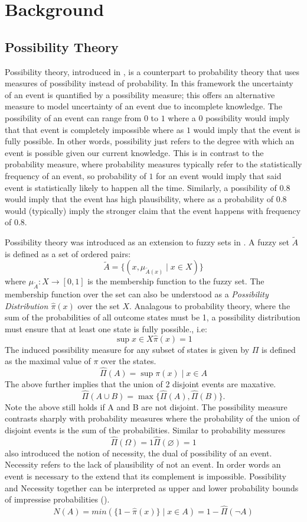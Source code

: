 \documentclass[14pt,a4paper]{report}
\begin{document}
\chapter{Background}
\section{Possibility Theory}
Possibility theory, introduced in \cite{ZADEH19999}, is a counterpart to probability theory that uses measures of possibility instead of probability.
In this framework the uncertainty of an event is quantified by a possibility measure; this offers an alternative measure to model uncertainty of an event due to incomplete knowledge.
The possibility of an event can range from $0$ to $1$ where a $0$ possibility would imply that that event is completely impossible where as $1$ would imply that the event is fully possible.
In other words, possibility just refers to the degree with which an event is possible given our current knowledge.
This is in contrast to the probability measure, where probability measures typically refer to the statistically frequency of an event, so probability of $1$ for an event would imply that said event is statistically likely to happen all the time.
Similarly, a possibility of $0.
8$ would imply that the event has high plausibility, where as a probability of $0.8$ would (typically) imply the stronger claim that the event happens with frequency of 0.8. \par

Possibility theory was introduced as an extension to fuzzy sets in \cite{ZADEH19999}. A fuzzy set $\tilde{A}$ is defined as a set of ordered pairs:
\[
  \tilde{A} = \{(x, \mu_{\tilde{A}(x)} \mid x \in X)\} 
\]
where $\mu_{\tilde{A}}: X \to [0,1]$ is the membership function to the fuzzy set. The membership function over the set can also be understood as a \emph{Possibility Distribution $\hat{\pi}(x)$} over the set $X$. Analagous to probability theory, where the sum of the probabilities of all outcome states must be 1, a possibility distribution must ensure that at least one state is fully possible., i.e:
\[
  \sup{x \in X} \hat{\pi}(x) = 1
\]
The induced possibility measure for any subset of states is given by $\Pi$ is defined as the maximal value of $\pi$ over the states. 
\[ \hat{\Pi}(A) = \sup {\pi(x) \mid x \in A} \]
The above further implies that the union of 2 disjoint events are maxative. 
\[
  \hat{\Pi}(A \cup B) = \max\{\hat{\Pi}(A),\hat{\Pi}(B)\}.
\]
Note the above still holds if A and B are not disjoint. The possibility measure contrasts sharply with probability measures where the probability of the union of disjoint events is the sum of the probabilities. Similar to probability messures 
\[
\hat{\Pi}(\Omega) = 1
\hat{\Pi}(\varnothing) = 1
\]
\cite{Dubois2001} also introduced the notion of necessity, the dual of possibility of an event. Necessity refers to the lack of plausibility of not an event. In order words an event is necessary to the extend that its complement is impossible. Possibility and Necessity together can be interpreted as upper and lower probability bounds of impressise probabilities (\cite{DUBOIS199265}). 
\[
  N(A) = min(\{1-\hat{\pi}(x)\} \mid x \in A) = 1 - \hat{\Pi}(\neg A)
\]
\end{document}
